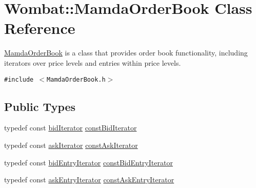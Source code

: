 \hypertarget{classWombat_1_1MamdaOrderBook}{
\section{Wombat::Mamda\-Order\-Book Class Reference}
\label{classWombat_1_1MamdaOrderBook}
}
\hyperlink{classWombat_1_1MamdaOrderBook}{Mamda\-Order\-Book} is a class that provides order book functionality, including iterators over price levels and entries within price levels.  


{\tt \#include $<$Mamda\-Order\-Book.h$>$}

\subsection*{Public Types}
\begin{CompactItemize}
\item 
typedef const \hyperlink{classWombat_1_1MamdaOrderBook_1_1bidIterator}{bid\-Iterator} \hyperlink{classWombat_1_1MamdaOrderBook_dd118d4eb3fe29c05849edcf44adbe82}{const\-Bid\-Iterator}
\item 
typedef const \hyperlink{classWombat_1_1MamdaOrderBook_1_1askIterator}{ask\-Iterator} \hyperlink{classWombat_1_1MamdaOrderBook_1940ae6b53c2b3ac52d993b210348aa3}{const\-Ask\-Iterator}
\item 
typedef const \hyperlink{classWombat_1_1MamdaOrderBook_1_1bidEntryIterator}{bid\-Entry\-Iterator} \hyperlink{classWombat_1_1MamdaOrderBook_810e5a11611b496135222afb9384e05a}{const\-Bid\-Entry\-Iterator}
\item 
typedef const \hyperlink{classWombat_1_1MamdaOrderBook_1_1askEntryIterator}{ask\-Entry\-Iterator} \hyperlink{classWombat_1_1MamdaOrderBook_6403d4a200588697738b14a87e43a53e}{const\-Ask\-Entry\-Iterator}
\end{CompactItemize}
